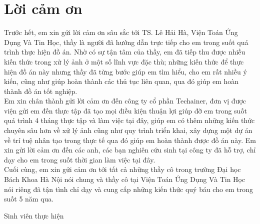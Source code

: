 \documentclass[a4paper, 12pt]{report}
\begin{document}
\chapter*{Lời cảm ơn}
Trước hết, em xin gửi lời cảm ơn sâu sắc tới TS. Lê Hải Hà, Viện Toán Ứng Dụng Và Tin Học, thầy là người đã hướng dẫn trực tiếp cho
em trong suốt quá trình thực hiện đồ án. Nhờ có sự tận tâm
của thầy, em đã tiếp thu được nhiều kiến thức trong xử lý ảnh ở một số lĩnh vực đặc thù; những kiến thức để thực hiện đồ án này nhưng thầy đã từng bước giúp em tìm hiểu, cho em rất nhiều
ý kiến, cũng như giúp hoàn thành các thủ tục liên quan, qua đó giúp em hoàn
thành đồ án tốt nghiệp.  \\
\hspace*{1cm}Em xin chân thành gửi lời cảm ơn đến công ty cổ phần Techainer,  đơn vị được viện gửi em đến thực tập  đã tạo mọi điều kiện thuận lợi giúp đỡ em
trong suốt quá trình 4 tháng thực tập và làm việc tại đây, giúp em có thêm những kiến thức chuyên sâu hơn về xử lý ảnh cũng như quy trình triển khai, xây dựng một dự án về trí tuệ nhân tạo trong thực tế  qua đó giúp
em hoàn thành được đồ án này. Em xin gửi lời cảm ơn đến các anh, các bạn
nghiên cứu sinh tại công ty đã hỗ trợ, chỉ dạy cho em trong suốt thời gian
làm việc tại đây.  \\
\hspace*{1cm}Cuối cùng, em xin gửi cảm ơn tới tất cả những thầy cô trong trường Đại học Bách Khoa Hà Nội nói chung và thầy cô tại Viện Toán Ứng Dụng Và Tin Học nói riêng đã tận tình chỉ dạy và cung cấp những kiến thức quý báu cho em trong suốt 5 năm qua.
\begin{flushright}
Sinh viên thực hiện
\end{flushright}
\end{document}

